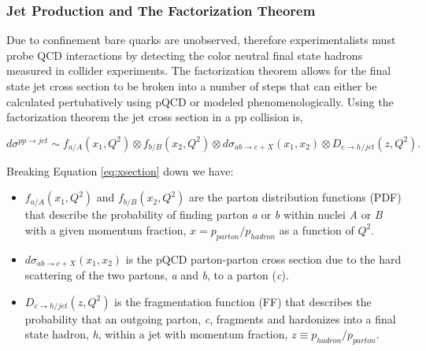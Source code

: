 \subsubsection{Jet Production and The Factorization Theorem}\label{sec:fac}

Due to confinement bare quarks are unobserved, therefore experimentalists must probe QCD interactions by detecting the color neutral final state hadrons measured in collider experiments.  The factorization theorem allows for the final state jet cross section to be broken into a number of steps that can either be calculated pertubatively using pQCD or modeled phenomenologically.  Using the factorization theorem the jet cross section in a pp collision is,


\begin{equation}
d\sigma^{pp \rightarrow jet} \sim f_{a/A}(x_{1},Q^{2}) \otimes  f_{b/B}(x_{2},Q^{2}) \otimes d\sigma_{ab \rightarrow c + X} (x_{1},x_{2}) \otimes D_{c \rightarrow h/jet}(z,Q^{2}).
\label{eq:xsection}
\end{equation}

\noindent
Breaking Equation \ref{eq:xsection} down we have:

\begin{itemize}
\item  $ f_{a/A}(x_{1},Q^{2})$ and $ f_{b/B}(x_{2},Q^{2})$ are the parton distribution functions (PDF) that describe the probability of finding parton \textit{a} or \textit{b} within nuclei \textit{A} or \textit{B} with a given momentum fraction, $x = p_{parton} / p_{hadron} $ as a function of $Q^{2}$.
\item  $d\sigma_{ab \rightarrow c + X} (x_{1},x_{2})$ is the pQCD parton-parton cross section due to the hard scattering of the two partons, \textit{a} and \textit{b}, to a parton (\textit{c}).
\item   $ D_{c \rightarrow h/jet}(z,Q^{2})$ is the fragmentation function (FF) that describes the probability that an outgoing parton, \textit{c}, fragments and hardonizes into a final state hadron, \textit{h}, within a jet with momentum fraction, $z \equiv p_{hadron} / p_{parton}$.
\end{itemize}


